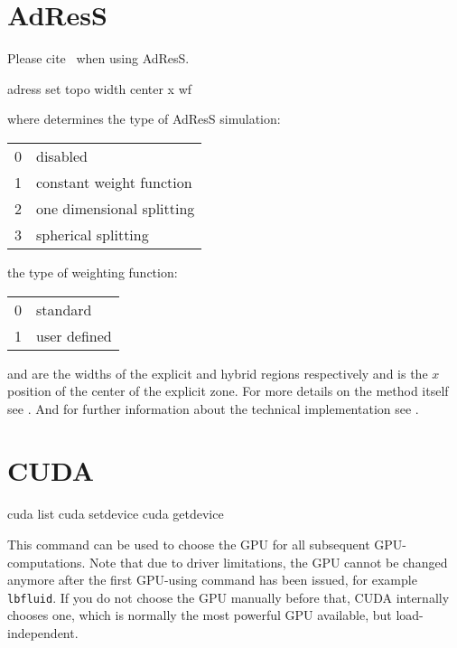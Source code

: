 \section{AdResS}

\begin{citebox}
  Please cite~ when using AdResS.
\end{citebox}

\begin{essyntax}
adress set topo  width   center x  wf 
\begin{features}
  \end{features}
\end{essyntax}

where  determines the type of AdResS simulation:\newline
\begin{tabular}{ll}
0&disabled\\
1&constant weight function\\
2&one dimensional splitting\\
3&spherical splitting
\end{tabular}\newline
{} the type of weighting function:\newline
\begin{tabular}{ll}
0&standard\\
1&user defined
\end{tabular}\newline
{} and  are the widths of the explicit and hybrid regions respectively and  is the $x$ position of the center of the explicit zone.
For more details on the method itself see \cite{praprotnik05,praprotnik08,poblete10}.
And for further information about the technical implementation see \cite{adress}.

\section{CUDA}
\label{sec:cuda}
\begin{essyntax}
   cuda list
   cuda setdevice 
   cuda getdevice
\end{essyntax}

This command can be used to choose the GPU for all subsequent
GPU-computations. Note that due to driver limitations, the GPU cannot
be changed anymore after the first GPU-using command has been issued,
for example \texttt{lbfluid}. If you do not choose the GPU manually
before that, CUDA internally chooses one, which is normally the most
powerful GPU available, but load-independent.

